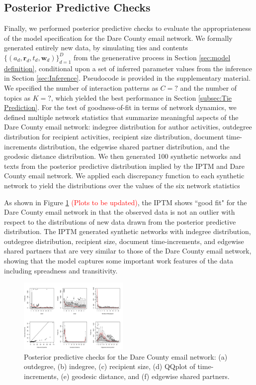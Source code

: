 \documentclass{article}
\begin{document}
\subsection{Posterior Predictive Checks}\label{subsec:PPC}
Finally, we performed posterior predictive checks \cite{rubin1984bayesianly} to evaluate the appropriateness of the model specification for the Dare County email network. We formally generated entirely new data, by simulating ties and contents $\{(a_{d}, \boldsymbol{r}_{d}, t_{d}, \boldsymbol{w}_{d})\}_{d=1}^D$ from the genenerative process in Section \ref{sec:model definition}, conditional upon a set of inferred parameter values from the inference in Section \ref{sec:Inference}. Pseudocode is provided in the supplementary material. We specified the number of interaction patterns as $C=?$ and the number of topics as $K = ?$, which yielded the best performance in Section \ref{subsec:Tie Prediction}. For the test of goodness-of-fit in terms of network dynamics, we defined multiple network statistics that summarize meaningful aspects of the Dare County email network: indegree distribution for author activities, outdegree distribution for recipient activities, recipient size distribution, document time-increments distribution, the edgewise shared partner distribution, and the geodesic distance distribution. We then generated 100 synthetic networks and texts from the posterior predictive distribution implied by the IPTM and Dare County email network.
We applied each discrepancy function to each synthetic network to yield the distributions over the values of the six network statistics

As shown in Figure \ref{fig:PPC} \textcolor{red}{(Plots to be updated)}, the IPTM shows ``good fit" for the Dare County email network in that the observed data is not an outlier with respect to the distributions of new data drawn from the posterior predictive distribution. The IPTM generated synthetic networks with indegree distribution, outdegree distribution, recipient size, document time-increments, and edgewise shared partners that are very similar to those of the Dare County email network, showing that the model captures some important work features of the data including spreadness and transitivity. 
\begin{figure}[tb]
	\centering
	\includegraphics[width = 0.47\textwidth]{plots/PPC_plot-1.png}
	\caption{Posterior predictive checks for the Dare County email network: (a) outdegree, (b) indegree, (c) recipient size, (d) QQplot of time-increments, (e) geodesic distance, and (f) edgewise shared partners.}
	\label{fig:PPC}
\end{figure}
\end{document}
